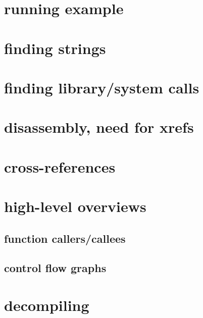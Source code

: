 \section{running example}


\section{finding strings}



\section{finding library/system calls}




\section{disassembly, need for xrefs}



\section{cross-references}


\section{high-level overviews}

\subsection{function callers/callees}


\subsection{control flow graphs}


\section{decompiling}


